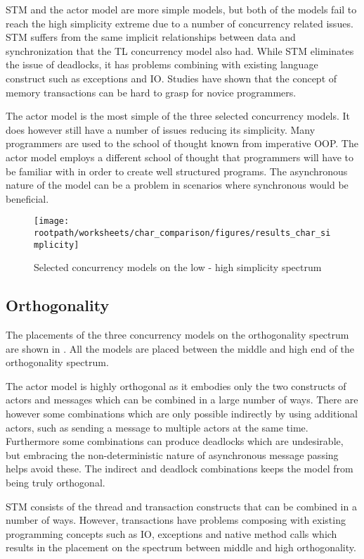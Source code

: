 \ac{STM} and the actor model are more simple models, but both of the models fail to reach the high simplicity extreme due to a number of concurrency related issues. \ac{STM} suffers from the same implicit relationships between data and synchronization that the \ac{TL} concurrency model also had. While \ac{STM} eliminates the issue of deadlocks, it has problems combining with existing language construct such as exceptions and \ac{IO}. Studies have shown that the concept of memory transactions can be hard to grasp for novice programmers.

The actor model is the most simple of the three selected concurrency models. It does however still have a number of issues reducing its simplicity. Many programmers are used to the school of thought known from imperative \ac{OOP}. The actor model employs a different school of thought that programmers will have to be familiar with in order to create well structured programs. The asynchronous nature of the model can be a problem in scenarios where synchronous would be beneficial.

\begin{figure}[htbp]
\centering
 \texttt{[image: \\rootpath/worksheets/char\_comparison/figures/results\_char\_simplicity]} 
 \caption{Selected concurrency models on the low - high simplicity spectrum}
\label{fig:results_char_simplicity}
\end{figure}

\subsection{Orthogonality}
The placements of the three concurrency models on the orthogonality spectrum are shown in . All the models are placed between the middle and high end of the orthogonality spectrum.

The actor model is highly orthogonal as it embodies only the two constructs of actors and messages which can be combined in a large number of ways. There are however some combinations which are only possible indirectly by using additional actors, such as sending a message to multiple actors at the same time. Furthermore some combinations can produce deadlocks which are undesirable, but embracing the non-deterministic nature of asynchronous message passing helps avoid these. The indirect and deadlock combinations keeps the model from being truly orthogonal.

\ac{STM} consists of the thread and transaction constructs that can be combined in a number of ways. However, transactions have problems
composing with existing programming concepts such as IO, exceptions and
native method calls which results in the placement on the spectrum between middle and high orthogonality.

